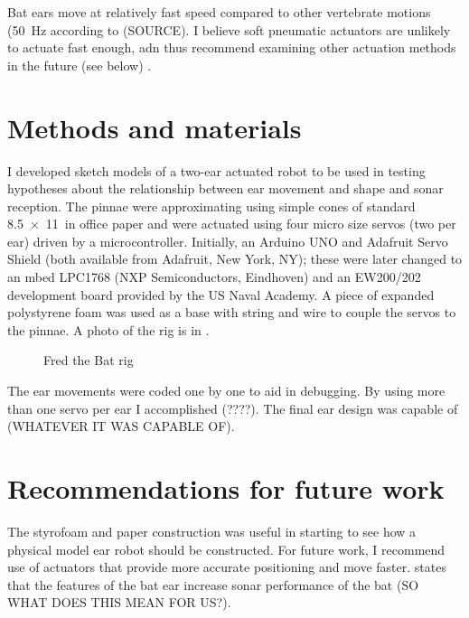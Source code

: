 \documentclass{article}
\begin{document}
Bat ears move at relatively fast speed compared to other vertebrate motions (\SI{50}{\hertz} according to (SOURCE). I believe soft pneumatic actuators are unlikely to actuate fast enough, adn thus recommend examining other actuation methods in the future (see below) \citep{hines2017soft}. 





\section{Methods and materials}
I developed sketch models of a two-ear actuated robot to be used in testing hypotheses about the relationship between ear movement and shape and sonar reception. The pinnae were approximating using simple cones of standard \SI{8.5x11}{in} office paper and were actuated using four micro size servos (two per ear) driven by a microcontroller. Initially, an Arduino UNO and Adafruit Servo Shield (both available from Adafruit, New York, NY); these were later changed to an mbed LPC1768 (NXP Semiconductors, Eindhoven) and an EW200/202 development board provided by the US Naval Academy. A piece of expanded polystyrene foam was used as a base with string and wire to couple the servos to the pinnae. A photo of the rig is in .
\begin{figure}[h]
\caption{Fred the Bat rig}
\label{fig:3}
\end{figure}

The ear movements were coded one by one to aid in debugging. By using more than one servo per ear I accomplished (????).  The final ear design was capable of (WHATEVER IT WAS CAPABLE OF). 
%





\section{Recommendations for future work}
The styrofoam and paper construction was useful in starting to see how a physical model ear robot should be constructed. For future work, I recommend use of actuators that provide more accurate positioning and move faster. \citep{pannala2013interplay} states that the features of the bat ear increase sonar performance of the bat (SO WHAT DOES THIS MEAN FOR US?). 
\end{document}
